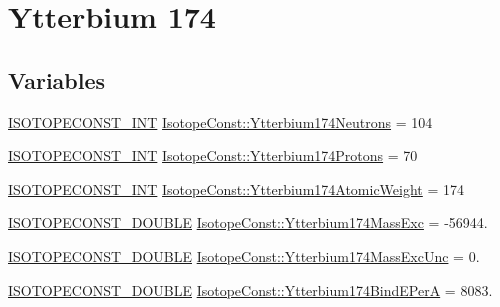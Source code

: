 \hypertarget{group___isotope_const-_ytterbium-_yb174}{}\section{Ytterbium 174}
\label{group___isotope_const-_ytterbium-_yb174}
\subsection*{Variables}
\begin{DoxyCompactItemize}
\item 
\mbox{\hyperlink{group___isotope_const-_macros_ga5f18360b3e99483a35c32d789e62621c}{I\+S\+O\+T\+O\+P\+E\+C\+O\+N\+S\+T\+\_\+\+I\+NT}} \mbox{\hyperlink{group___isotope_const-_ytterbium-_yb174_ga846a74587b14c6cae03c62ad4a2b102d}{Isotope\+Const\+::\+Ytterbium174\+Neutrons}} = 104
\item 
\mbox{\hyperlink{group___isotope_const-_macros_ga5f18360b3e99483a35c32d789e62621c}{I\+S\+O\+T\+O\+P\+E\+C\+O\+N\+S\+T\+\_\+\+I\+NT}} \mbox{\hyperlink{group___isotope_const-_ytterbium-_yb174_gab9b5e087988e9c65616a935c21be87f8}{Isotope\+Const\+::\+Ytterbium174\+Protons}} = 70
\item 
\mbox{\hyperlink{group___isotope_const-_macros_ga5f18360b3e99483a35c32d789e62621c}{I\+S\+O\+T\+O\+P\+E\+C\+O\+N\+S\+T\+\_\+\+I\+NT}} \mbox{\hyperlink{group___isotope_const-_ytterbium-_yb174_gaa81543e6513517a95e35df951f6e9ee7}{Isotope\+Const\+::\+Ytterbium174\+Atomic\+Weight}} = 174
\item 
\mbox{\hyperlink{group___isotope_const-_macros_ga8f45a7272ce02c0b4c65c44636ed719a}{I\+S\+O\+T\+O\+P\+E\+C\+O\+N\+S\+T\+\_\+\+D\+O\+U\+B\+LE}} \mbox{\hyperlink{group___isotope_const-_ytterbium-_yb174_gaf41e71d62661303bf7c02c56a58d97f1}{Isotope\+Const\+::\+Ytterbium174\+Mass\+Exc}} = -\/56944.
\item 
\mbox{\hyperlink{group___isotope_const-_macros_ga8f45a7272ce02c0b4c65c44636ed719a}{I\+S\+O\+T\+O\+P\+E\+C\+O\+N\+S\+T\+\_\+\+D\+O\+U\+B\+LE}} \mbox{\hyperlink{group___isotope_const-_ytterbium-_yb174_gafb8132dc217be192a1072f5694ee9e7b}{Isotope\+Const\+::\+Ytterbium174\+Mass\+Exc\+Unc}} = 0.
\item 
\mbox{\hyperlink{group___isotope_const-_macros_ga8f45a7272ce02c0b4c65c44636ed719a}{I\+S\+O\+T\+O\+P\+E\+C\+O\+N\+S\+T\+\_\+\+D\+O\+U\+B\+LE}} \mbox{\hyperlink{group___isotope_const-_ytterbium-_yb174_gaeb1603ea8760e2cd9e1afb6a33d3861e}{Isotope\+Const\+::\+Ytterbium174\+Bind\+E\+PerA}} = 8083.
\item 

\end{DoxyCompactItemize}
